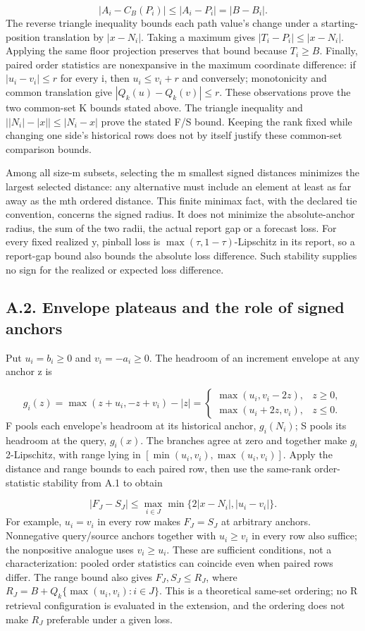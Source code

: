 \documentclass[10pt,a4paper]{article}
\begin{document}
\[
|A_i-C_B(P_i)|\le |A_i-P_i|=|B-B_i|.
\]
The reverse triangle inequality bounds each path value's change under a starting-position translation by \(|x-N_i|\). Taking a maximum gives \(|T_i-P_i|\le|x-N_i|\). Applying the same floor projection preserves that bound because \(T_i\ge B\). Finally, paired order statistics are nonexpansive in the maximum coordinate difference: if \(|u_i-v_i|\le r\) for every i, then \(u_i\le v_i+r\) and conversely; monotonicity and common translation give \(|Q_k(u)-Q_k(v)|\le r\). These observations prove the two common-set K bounds stated above. The triangle inequality and \(\bigl||N_i|-|x|\bigr|\le|N_i-x|\) prove the stated F/S bound. Keeping the rank fixed while changing one side's historical rows does not by itself justify these common-set comparison bounds.

Among all size-m subsets, selecting the m smallest signed distances minimizes the largest selected distance: any alternative must include an element at least as far away as the mth ordered distance. This finite minimax fact, with the declared tie convention, concerns the signed radius. It does not minimize the absolute-anchor radius, the sum of the two radii, the actual report gap or a forecast loss. For every fixed realized y, pinball loss is \(\max(\tau,1-\tau)\)-Lipschitz in its report, so a report-gap bound also bounds the absolute loss difference. Such stability supplies no sign for the realized or expected loss difference.

\subsection*{A.2. Envelope plateaus and the role of signed anchors}
Put \(u_i=b_i\ge0\) and \(v_i=-a_i\ge0\). The headroom of an increment envelope at any anchor z is

\[
g_i(z)=\max(z+u_i,-z+v_i)-|z|=\begin{cases}\max(u_i,v_i-2z),&z\ge0,\\\max(u_i+2z,v_i),&z\le0.\end{cases}
\]
F pools each envelope's headroom at its historical anchor, \(g_i(N_i)\); S pools its headroom at the query, \(g_i(x)\). The branches agree at zero and together make \(g_i\) 2-Lipschitz, with range lying in \([\min(u_i,v_i),\max(u_i,v_i)]\). Apply the distance and range bounds to each paired row, then use the same-rank order-statistic stability from A.1 to obtain

\[
|F_J-S_J|\le\max_{i\in J}\min\{2|x-N_i|,|u_i-v_i|\}.
\]
For example, \(u_i=v_i\) in every row makes \(F_J=S_J\) at arbitrary anchors. Nonnegative query/source anchors together with \(u_i\ge v_i\) in every row also suffice; the nonpositive analogue uses \(v_i\ge u_i\). These are sufficient conditions, not a characterization: pooled order statistics can coincide even when paired rows differ. The range bound also gives \(F_J,S_J\le R_J\), where \(R_J=B+Q_k\{\max(u_i,v_i):i\in J\}\). This is a theoretical same-set ordering; no R retrieval configuration is evaluated in the extension, and the ordering does not make \(R_J\) preferable under a given loss.
\end{document}
